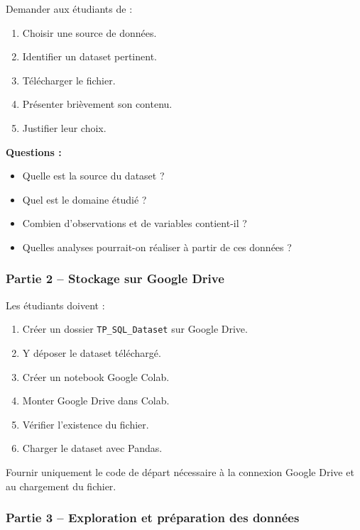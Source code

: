 \documentclass[
]{article}
\providecommand{\tightlist}{%
  \setlength{\itemsep}{0pt}\setlength{\parskip}{0pt}}
\begin{document}
Demander aux étudiants de :

\begin{enumerate}
\def\labelenumi{\arabic{enumi}.}
\tightlist
\item
  Choisir une source de données.
\item
  Identifier un dataset pertinent.
\item
  Télécharger le fichier.
\item
  Présenter brièvement son contenu.
\item
  Justifier leur choix.
\end{enumerate}

\textbf{Questions :}

\begin{itemize}
\tightlist
\item
  Quelle est la source du dataset ?
\item
  Quel est le domaine étudié ?
\item
  Combien d'observations et de variables contient-il ?
\item
  Quelles analyses pourrait-on réaliser à partir de ces données ?
\end{itemize}

\subsubsection{Partie 2 -- Stockage sur Google
Drive}\label{partie-2-stockage-sur-google-drive}

Les étudiants doivent :

\begin{enumerate}
\def\labelenumi{\arabic{enumi}.}
\tightlist
\item
  Créer un dossier \texttt{TP\_SQL\_Dataset} sur Google Drive.
\item
  Y déposer le dataset téléchargé.
\item
  Créer un notebook Google Colab.
\item
  Monter Google Drive dans Colab.
\item
  Vérifier l'existence du fichier.
\item
  Charger le dataset avec Pandas.
\end{enumerate}

Fournir uniquement le code de départ nécessaire à la connexion Google
Drive et au chargement du fichier.

\subsubsection{Partie 3 -- Exploration et préparation des
données}\label{partie-3-exploration-et-pruxe9paration-des-donnuxe9es}
\end{document}
